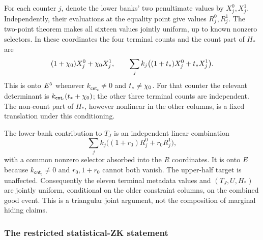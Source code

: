 For each counter $j$, denote the lower banks' two penultimate values by $X_j^0,X_j^1$. Independently, their evaluations at the equality point give values $R_j^0,R_j^1$. The two-point theorem makes all sixteen values jointly uniform, up to known nonzero selectors. In these coordinates the four terminal counts and the count part of $H_*$ are
\[
 (1+\chi_0)X_j^0+\chi_0X_j^1,
 \qquad
 \sum_j k_j\bigl((1+t_*)X_j^0+t_*X_j^1\bigr).
\]
This is onto $E^5$ whenever $k_{\mathsf{cnt_c}}\ne0$ and $t_*\ne\chi_0$. For that counter the relevant determinant is $k_{\mathsf{cnt_c}}(t_*+\chi_0)$; the other three terminal counts are independent. The non-count part of $H_*$, however nonlinear in the other columns, is a fixed translation under this conditioning.

The lower-bank contribution to $T_J$ is an independent linear combination
\[
 \sum_j k_j\bigl((1+r_0)R_j^0+r_0R_j^1\bigr),
\]
with a common nonzero selector absorbed into the $R$ coordinates. It is onto $E$ because $k_{\mathsf{cnt_c}}\ne0$ and $r_0,1+r_0$ cannot both vanish. The upper-half target is unaffected. Consequently the eleven terminal metadata values and $(T_J,U,H_*)$ are jointly uniform, conditional on the older constraint columns, on the combined good event. This is a triangular joint argument, not the composition of marginal hiding claims.

\subsubsection{The restricted statistical-ZK statement}

